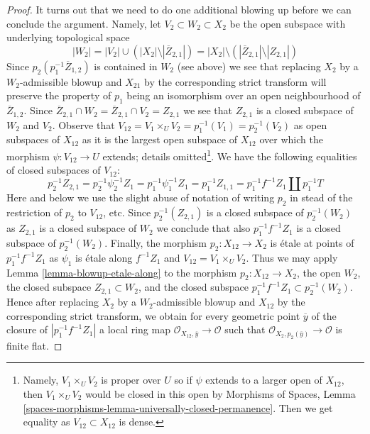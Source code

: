 \documentclass[10pt,a4paper]{amsart}
\theoremstyle{plain}
\theoremstyle{definition}
\theoremstyle{remark}
\numberwithin{equation}{subsection}
\begin{document}
\begin{proof}
\medskip\noindent
It turns out that we need to do one additional blowing up before we
can conclude the argument. Namely, let $V_2 \subset W_2 \subset X_2$
be the open subspace with underlying topological space
$$
|W_2| =
|V_2| \cup (|X_2| \setminus |\overline{Z}_{2, 1}|) =
|X_2| \setminus \left(|\overline{Z}_{2, 1}| \setminus |Z_{2, 1}|\right)
$$
Since $p_2(p_1^{-1}\overline{Z}_{1, 2})$ is contained in $W_2$ (see above)
we see that replacing $X_2$ by a $W_2$-admissible blowup and $X_{21}$
by the corresponding strict transform will preserve the property of
$p_1$ being an isomorphism over an open neighbourhood of $\overline{Z}_{1, 2}$.
Since $\overline{Z}_{2, 1} \cap W_2 = \overline{Z}_{2, 1} \cap V_2 = Z_{2, 1}$
we see that $Z_{2, 1}$ is a closed subspace of $W_2$ and $V_2$.
Observe that $V_{12} = V_1 \times_U V_2 = p_1^{-1}(V_1) = p_2^{-1}(V_2)$
as open subspaces of $X_{12}$ as it is the largest open subspace of $X_{12}$
over which the morphism $\psi : V_{12} \to U$ extends; details
omitted\footnote{Namely, $V_1 \times_U V_2$ is proper over $U$ so if
$\psi$ extends to a larger open of $X_{12}$, then $V_1 \times_U V_2$
would be closed in this open by Morphisms of Spaces, Lemma
\ref{spaces-morphisms-lemma-universally-closed-permanence}.
Then we get equality as $V_{12} \subset X_{12}$ is dense.}.
We have the following equalities of closed subspaces of $V_{12}$:
$$
p_2^{-1}Z_{2, 1} = p_2^{-1} \psi_2^{-1} Z_1 =
p_1^{-1} \psi_1^{-1} Z_1= p_1^{-1}Z_{1, 1} =
p_1^{-1}f^{-1}Z_1 \amalg p_1^{-1}T
$$
Here and below we use the slight abuse of notation of writing $p_2$ in
stead of the restriction of $p_2$ to $V_{12}$, etc.
Since $p_2^{-1}(Z_{2, 1})$ is a closed subspace of $p_2^{-1}(W_2)$
as $Z_{2, 1}$ is a closed subspace of $W_2$ we conclude that also
$p_1^{-1}f^{-1}Z_1$ is a closed subspace of $p_2^{-1}(W_2)$.
Finally, the morphism $p_2 : X_{12} \to X_2$ is \'etale at points of
$p_1^{-1}f^{-1}Z_1$ as $\psi_1$ is \'etale along $f^{-1}Z_1$
and $V_{12} = V_1 \times_U V_2$.
Thus we may apply Lemma \ref{lemma-blowup-etale-along} to the morphism
$p_2 : X_{12} \to X_2$, the open $W_2$, the closed subspace
$Z_{2, 1} \subset W_2$, and the closed subspace
$p_1^{-1}f^{-1}Z_1 \subset p_2^{-1}(W_2)$.
Hence after replacing $X_2$ by a $W_2$-admissible blowup and $X_{12}$ by
the corresponding strict transform, we obtain for every geometric
point $\overline{y}$ of the closure of $|p_1^{-1}f^{-1}Z_1|$ a local ring map
$\mathcal{O}_{X_{12}, \overline{y}} \to \mathcal{O}$ such that
$\mathcal{O}_{X_2, p_2(\overline{y})} \to \mathcal{O}$ is finite flat.


\end{proof}
\end{document}
